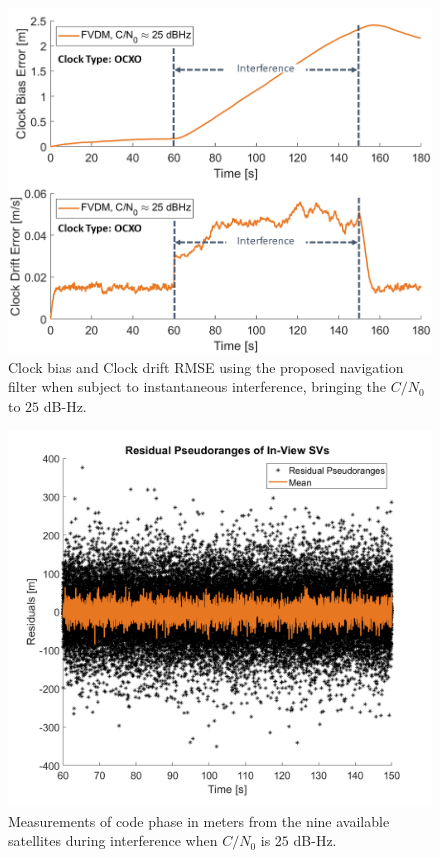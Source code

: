 \documentclass[12pt]{report}
\begin{document}
\begin{figure}[!ht]
  \centering
  \includegraphics[width=0.75\linewidth]{Figures/Results/trajectoryfigure/Slide22.PNG}
  \caption{Clock bias and Clock drift RMSE using the proposed navigation filter when subject to instantaneous interference, bringing the \(C/N_0\) to \(25\) dB-Hz.}\label{fig:Clk25}
\end{figure}

\begin{figure}[!ht]
  \centering
  \includegraphics[width=0.75\linewidth]{Figures/Results/Scenario1/Case25/codephase.png}
  \caption{Measurements of code phase in meters from the nine available satellites during interference when \(C/N_0\) is \(25\) dB-Hz.}\label{fig:codephase25}
\end{figure}
\end{document}
